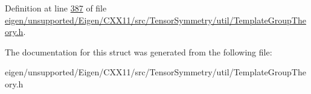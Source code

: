 Definition at line \hyperlink{eigen_2unsupported_2_eigen_2_c_x_x11_2src_2_tensor_symmetry_2util_2_template_group_theory_8h_source_l00387}{387} of file \hyperlink{eigen_2unsupported_2_eigen_2_c_x_x11_2src_2_tensor_symmetry_2util_2_template_group_theory_8h_source}{eigen/unsupported/\+Eigen/\+C\+X\+X11/src/\+Tensor\+Symmetry/util/\+Template\+Group\+Theory.\+h}.



The documentation for this struct was generated from the following file\+:\begin{DoxyCompactItemize}
\item 
eigen/unsupported/\+Eigen/\+C\+X\+X11/src/\+Tensor\+Symmetry/util/\+Template\+Group\+Theory.\+h\end{DoxyCompactItemize}
